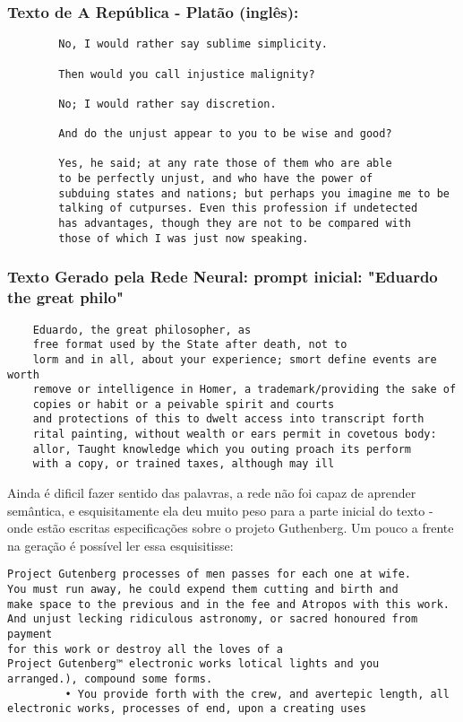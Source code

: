 \documentclass[a4paper,12pt]{article}
\begin{document}
\subsubsection*{\textbf{Texto de A República - Platão (inglês):}}

{
    \begin{verbatim}
        No, I would rather say sublime simplicity.
        
        Then would you call injustice malignity?
        
        No; I would rather say discretion.
        
        And do the unjust appear to you to be wise and good?
        
        Yes, he said; at any rate those of them who are able 
        to be perfectly unjust, and who have the power of 
        subduing states and nations; but perhaps you imagine me to be 
        talking of cutpurses. Even this profession if undetected 
        has advantages, though they are not to be compared with
        those of which I was just now speaking.
    \end{verbatim}
}

\subsubsection*{\textbf{Texto Gerado pela Rede Neural}: prompt inicial: "Eduardo the great philo"}
\begin{verbatim}
    Eduardo, the great philosopher, as
    free format used by the State after death, not to
    lorm and in all, about your experience; smort define events are worth
    remove or intelligence in Homer, a trademark/providing the sake of
    copies or habit or a peivable spirit and courts
    and protections of this to dwelt access into transcript forth
    rital painting, without wealth or ears permit in covetous body:
    allor, Taught knowledge which you outing proach its perform
    with a copy, or trained taxes, although may ill
\end{verbatim}

Ainda é dificil fazer sentido das palavras, a rede não foi capaz de aprender semântica, e esquisitamente ela 
deu muito peso para a parte inicial do texto - onde estão escritas especificações sobre o projeto Guthenberg.
Um pouco a frente na geração é possível ler essa esquisitisse:

\begin{verbatim}
Project Gutenberg processes of men passes for each one at wife. 
You must run away, he could expend them cutting and birth and 
make space to the previous and in the fee and Atropos with this work. 
And unjust lecking ridiculous astronomy, or sacred honoured from payment
for this work or destroy all the loves of a 
Project Gutenberg™ electronic works lotical lights and you 
arranged.), compound some forms.
         • You provide forth with the crew, and avertepic length, all
electronic works, processes of end, upon a creating uses
\end{verbatim}
\end{document}
